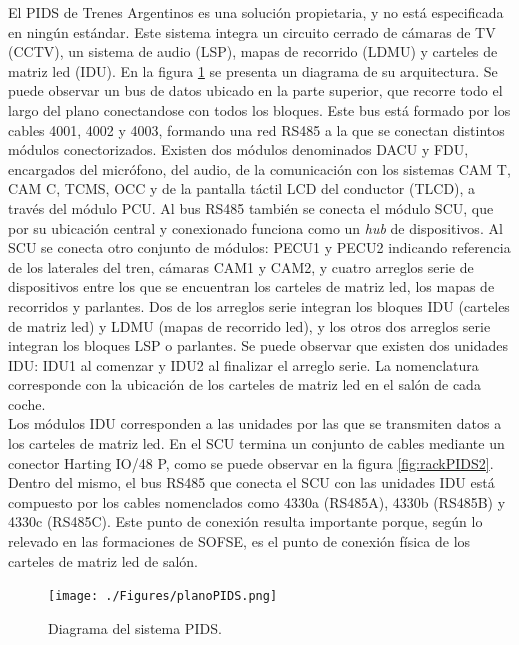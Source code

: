 El PIDS de Trenes Argentinos es una solución propietaria, y no está especificada en ningún estándar. Este sistema integra un circuito cerrado de cámaras de TV (CCTV), un sistema de audio (LSP), mapas de recorrido (LDMU) y carteles de matriz led (IDU). En la figura \ref{fig:diagramaPIDS} se presenta un diagrama de su arquitectura. Se puede observar un bus de datos ubicado en la parte superior, que recorre todo el largo del plano conectandose con todos los bloques. Este bus está formado por los cables 4001, 4002 y 4003, formando una red RS485 a la que se conectan distintos módulos conectorizados. Existen dos módulos denominados DACU y FDU, encargados del micrófono, del audio, de la comunicación con los sistemas CAM T, CAM C, TCMS, OCC y de la pantalla táctil LCD del conductor (TLCD), a través del módulo PCU. Al bus RS485 también se conecta el módulo SCU, que por su ubicación central y conexionado funciona como un \textit{hub} de dispositivos. Al SCU se conecta otro conjunto de módulos: PECU1 y PECU2 indicando referencia de los laterales del tren, cámaras CAM1 y CAM2, y cuatro arreglos serie de dispositivos entre los que se encuentran los carteles de matriz led, los mapas de recorridos y parlantes. Dos de los arreglos serie integran los bloques IDU (carteles de matriz led) y LDMU (mapas de recorrido led), y los otros dos arreglos serie integran los bloques LSP o parlantes. Se puede observar que existen dos unidades IDU: IDU1 al comenzar y IDU2 al finalizar el arreglo serie. La nomenclatura corresponde con la ubicación de los carteles de matriz led en el salón de cada coche. \\

Los módulos IDU corresponden a las unidades por las que se transmiten datos a los carteles de matriz led. En el SCU termina un conjunto de cables mediante un conector Harting IO/48 P, como se puede observar en la figura \ref{fig:rackPIDS2}. Dentro del mismo, el bus RS485 que conecta el SCU con las unidades IDU está compuesto por los cables nomenclados como 4330a (RS485A), 4330b (RS485B) y 4330c (RS485C). Este punto de conexión resulta importante porque, según lo relevado en las formaciones de SOFSE, es el punto de conexión física de los carteles de matriz led de salón.\\

\begin{figure}[htbp]
	\centering
	\texttt{[image: ./Figures/planoPIDS.png]}
	\caption{Diagrama del sistema PIDS.}
	\label{fig:diagramaPIDS}
\end{figure}




